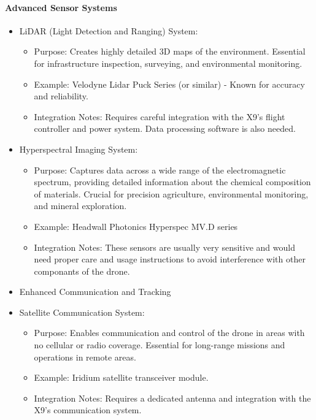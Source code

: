 

\paragraph{Advanced Sensor Systems}
\begin{itemize}
\item LiDAR (Light Detection and Ranging) System:
\begin{itemize}


\item Purpose: Creates highly detailed 3D maps of the environment. Essential for infrastructure inspection, surveying, and environmental monitoring.

\item Example: Velodyne Lidar Puck Series (or similar) - Known for accuracy and reliability.

\item Integration Notes: Requires careful integration with the X9's flight controller and power system. Data processing software is also needed.
\end{itemize}
\end{itemize}
\begin{itemize}
\item Hyperspectral Imaging System:
\begin{itemize}
\item Purpose: Captures data across a wide range of the electromagnetic spectrum, providing detailed information about the chemical composition of materials. Crucial for precision agriculture, environmental monitoring, and mineral exploration.

\item Example: Headwall Photonics Hyperspec MV.D series

\item Integration Notes: These sensors are usually very sensitive and would need proper care and usage instructions to avoid interference with other componants of the drone.
\end{itemize}
\end{itemize}
\begin{itemize}
\item {Enhanced Communication and Tracking}

\item Satellite Communication System:
\begin{itemize}

\item Purpose: Enables communication and control of the drone in areas with no cellular or radio coverage. Essential for long-range missions and operations in remote areas.

\item Example: Iridium satellite transceiver module.

\item Integration Notes: Requires a dedicated antenna and integration with the X9's communication system.
\end{itemize}
\end{itemize}
